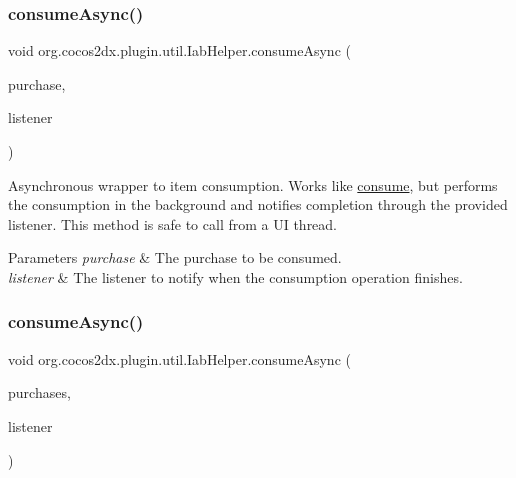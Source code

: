 \subsubsection{\texorpdfstring{consume\+Async()}{consumeAsync()}\hspace{0.1cm}{\footnotesize\ttfamily [1/2]}}
{\footnotesize\ttfamily void org.\+cocos2dx.\+plugin.\+util.\+Iab\+Helper.\+consume\+Async (\begin{DoxyParamCaption}\item[{\hyperlink{classorg_1_1cocos2dx_1_1plugin_1_1util_1_1Purchase}{Purchase}}]{purchase,  }\item[{\hyperlink{interfaceorg_1_1cocos2dx_1_1plugin_1_1util_1_1IabHelper_1_1OnConsumeFinishedListener}{On\+Consume\+Finished\+Listener}}]{listener }\end{DoxyParamCaption})\hspace{0.3cm}{\ttfamily [inline]}}

Asynchronous wrapper to item consumption. Works like \hyperlink{}{consume}, but performs the consumption in the background and notifies completion through the provided listener. This method is safe to call from a UI thread.


\begin{DoxyParams}{Parameters}
{\em purchase} & The purchase to be consumed. \\
\hline
{\em listener} & The listener to notify when the consumption operation finishes. \\
\hline
\end{DoxyParams}
\mbox{\label{classorg_1_1cocos2dx_1_1plugin_1_1util_1_1IabHelper_a347fa3413cc9fe458d47a82f5f651c73}} 
\subsubsection{\texorpdfstring{consume\+Async()}{consumeAsync()}\hspace{0.1cm}{\footnotesize\ttfamily [2/2]}}
{\footnotesize\ttfamily void org.\+cocos2dx.\+plugin.\+util.\+Iab\+Helper.\+consume\+Async (\begin{DoxyParamCaption}\item[{List$<$ \hyperlink{classorg_1_1cocos2dx_1_1plugin_1_1util_1_1Purchase}{Purchase} $>$}]{purchases,  }\item[{\hyperlink{interfaceorg_1_1cocos2dx_1_1plugin_1_1util_1_1IabHelper_1_1OnConsumeMultiFinishedListener}{On\+Consume\+Multi\+Finished\+Listener}}]{listener }\end{DoxyParamCaption})\hspace{0.3cm}{\ttfamily [inline]}}

